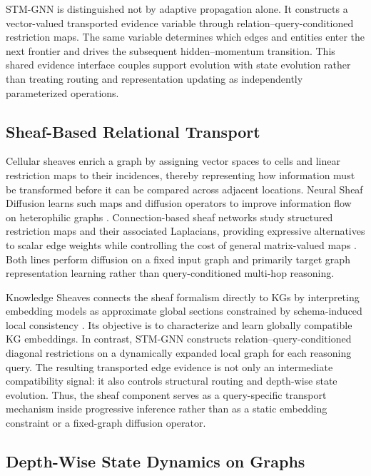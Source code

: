 \documentclass[a4paper,fleqn]{cas-sc}
\begin{document}
STM-GNN is distinguished not by adaptive propagation alone. It constructs a
vector-valued transported evidence variable through relation--query-conditioned
restriction maps. The same variable determines which edges and entities enter
the next frontier and drives the subsequent hidden--momentum transition. This
shared evidence interface couples support evolution with state evolution rather
than treating routing and representation updating as independently
parameterized operations.

\subsection{Sheaf-Based Relational Transport}\label{subsec:sheaf_related}

Cellular sheaves enrich a graph by assigning vector spaces to cells and linear
restriction maps to their incidences, thereby representing how information must
be transformed before it can be compared across adjacent locations. Neural
Sheaf Diffusion learns such maps and diffusion operators to improve information
flow on heterophilic graphs \citep{bodnar2022neural}. Connection-based sheaf
networks study structured restriction maps and their associated Laplacians,
providing expressive alternatives to scalar edge weights while controlling the
cost of general matrix-valued maps \citep{barbero2022sheaf}. Both lines perform
diffusion on a fixed input graph and primarily target graph representation
learning rather than query-conditioned multi-hop reasoning.

Knowledge Sheaves connects the sheaf formalism directly to KGs by interpreting
embedding models as approximate global sections constrained by schema-induced
local consistency \citep{gebhart2023knowledge}. Its objective is to characterize
and learn globally compatible KG embeddings. In contrast, STM-GNN constructs
relation--query-conditioned diagonal restrictions on a dynamically expanded
local graph for each reasoning query. The resulting transported edge evidence
is not only an intermediate compatibility signal: it also controls structural
routing and depth-wise state evolution. Thus, the sheaf component serves as a
query-specific transport mechanism inside progressive inference rather than as
a static embedding constraint or a fixed-graph diffusion operator.

\subsection{Depth-Wise State Dynamics on Graphs}
\label{subsec:state_dynamics_related}
\end{document}
